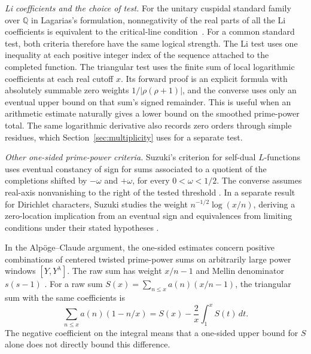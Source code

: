 \documentclass[11pt]{amsart}
\theoremstyle{definition}
\theoremstyle{remark}
\numberwithin{equation}{section}
\begin{document}
\emph{Li coefficients and the choice of test.}
For the unitary cuspidal standard family over \(\mathbb Q\)
in Lagarias's formulation, nonnegativity of the real parts
of all the Li coefficients is equivalent to the critical-line
condition~\cite[Theorem~2.4]{LagariasAutomorphicLi}.
For a common standard test, both criteria therefore have
the same logical strength. The Li test uses one inequality
at each positive integer index of the sequence attached
to the completed function. The triangular test uses the
finite sum of local logarithmic coefficients at each
real cutoff \(x\). Its forward proof is an explicit formula
with absolutely summable zero weights
\(1/|\rho(\rho+1)|\), and the converse uses only an eventual
upper bound on that sum's signed remainder. This is useful
when an arithmetic estimate naturally gives a lower bound
on the smoothed prime-power total. The same logarithmic
derivative also records zero orders through simple residues,
which Section~\ref{sec:multiplicity} uses for a separate test.

\emph{Other one-sided prime-power criteria.}
Suzuki's criterion for self-dual \(L\)-functions uses eventual
constancy of sign for sums associated to a quotient of the
completions shifted by \(-\omega\) and \(+\omega\), for every
\(0<\omega<1/2\). The converse assumes real-axis nonvanishing to the
right of the tested threshold
\cite[Theorem~2.3 and Eq.~(4.3)]{SuzukiMonotonicity}.
In a separate result for Dirichlet characters, Suzuki studies the
weight \(n^{-1/2}\log(x/n)\), deriving a zero-location implication
from an eventual sign and equivalences from limiting conditions
under their stated hypotheses
\cite[Theorems~6 and~8]{SuzukiChebyshev}.

In the Alp\"oge--Claude argument, the one-sided estimates concern
positive combinations of centered twisted prime-power sums on
arbitrarily large power windows \([Y,Y^\lambda]\).
The raw sum has weight \(x/n-1\) and Mellin denominator \(s(s-1)\)
\cite[Eq.~(2.3) and Proposition~2.2]{SlijepcevicAlpogeOutline}
\cite[Proposition~2.1 and Eq.~(2.1)]{ZhangAlpogeNote}.
For a raw sum \(S(x)=\sum_{n\le x}a(n)(x/n-1)\), the triangular
sum with the same coefficients is
\[
 \sum_{n\le x}a(n)(1-n/x)=S(x)-\frac{2}{x}\int_1^x S(t)\,dt .
\]
The negative coefficient on the integral means that a one-sided
upper bound for \(S\) alone does not directly bound this difference.
\end{document}
